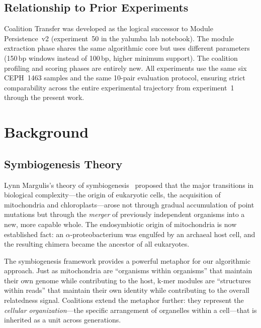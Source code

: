 \documentclass{../yalumba}
\begin{document}
\subsection{Relationship to Prior Experiments}

Coalition Transfer was developed as the logical successor to Module
Persistence~v2 (experiment~50 in the yalumba lab notebook).  The module
extraction phase shares the same algorithmic core but uses different
parameters (150\,bp windows instead of 100\,bp, higher minimum support).  The
coalition profiling and scoring phases are entirely new.  All experiments use
the same six CEPH~1463 samples and the same 10-pair evaluation protocol,
ensuring strict comparability across the entire experimental trajectory from
experiment~1 through the present work.


\section{Background}
\label{sec:background}

\subsection{Symbiogenesis Theory}


Lynn Margulis's theory of symbiogenesis~\cite{margulis1998} proposed that
the major transitions in biological complexity---the origin of eukaryotic
cells, the acquisition of mitochondria and chloroplasts---arose not through
gradual accumulation of point mutations but through the \emph{merger} of
previously independent organisms into a new, more capable whole.  The
endosymbiotic origin of mitochondria is now established fact: an
$\alpha$-proteobacterium was engulfed by an archaeal host cell, and the
resulting chimera became the ancestor of all eukaryotes.

The symbiogenesis framework provides a powerful metaphor for our algorithmic
approach.  Just as mitochondria are ``organisms within organisms'' that
maintain their own genome while contributing to the host, k-mer modules are
``structures within reads'' that maintain their own identity while contributing
to the overall relatedness signal.  Coalitions extend the metaphor further:
they represent the \emph{cellular organization}---the specific arrangement of
organelles within a cell---that is inherited as a unit across generations.
\end{document}
